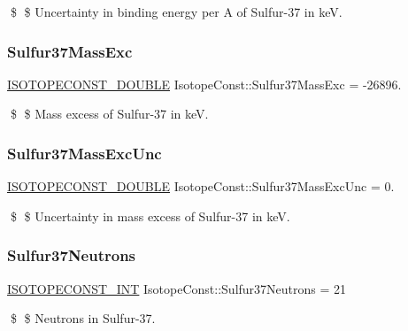 \$ \$ Uncertainty in binding energy per A of Sulfur-\/37 in keV. \mbox{\label{group___isotope_const-_sulfur-_s37_ga4766d3ab6ca4d002a3e1e91a6e39f34e}} 
\subsubsection{\texorpdfstring{Sulfur37\+Mass\+Exc}{Sulfur37MassExc}}
{\footnotesize\ttfamily \mbox{\hyperlink{group___isotope_const-_macros_ga8f45a7272ce02c0b4c65c44636ed719a}{I\+S\+O\+T\+O\+P\+E\+C\+O\+N\+S\+T\+\_\+\+D\+O\+U\+B\+LE}} Isotope\+Const\+::\+Sulfur37\+Mass\+Exc = -\/26896.}

\$ \$ Mass excess of Sulfur-\/37 in keV. \mbox{\label{group___isotope_const-_sulfur-_s37_ga89ec7a9bf7a094a028a634fd9797ece0}} 
\subsubsection{\texorpdfstring{Sulfur37\+Mass\+Exc\+Unc}{Sulfur37MassExcUnc}}
{\footnotesize\ttfamily \mbox{\hyperlink{group___isotope_const-_macros_ga8f45a7272ce02c0b4c65c44636ed719a}{I\+S\+O\+T\+O\+P\+E\+C\+O\+N\+S\+T\+\_\+\+D\+O\+U\+B\+LE}} Isotope\+Const\+::\+Sulfur37\+Mass\+Exc\+Unc = 0.}

\$ \$ Uncertainty in mass excess of Sulfur-\/37 in keV. \mbox{\label{group___isotope_const-_sulfur-_s37_gab18505546f8666a0eba888e81e18241c}} 
\subsubsection{\texorpdfstring{Sulfur37\+Neutrons}{Sulfur37Neutrons}}
{\footnotesize\ttfamily \mbox{\hyperlink{group___isotope_const-_macros_ga5f18360b3e99483a35c32d789e62621c}{I\+S\+O\+T\+O\+P\+E\+C\+O\+N\+S\+T\+\_\+\+I\+NT}} Isotope\+Const\+::\+Sulfur37\+Neutrons = 21}

\$ \$ Neutrons in Sulfur-\/37. \mbox{\label{group___isotope_const-_sulfur-_s37_ga762990dbcf5b56cd76a59dd29998586a}} 
